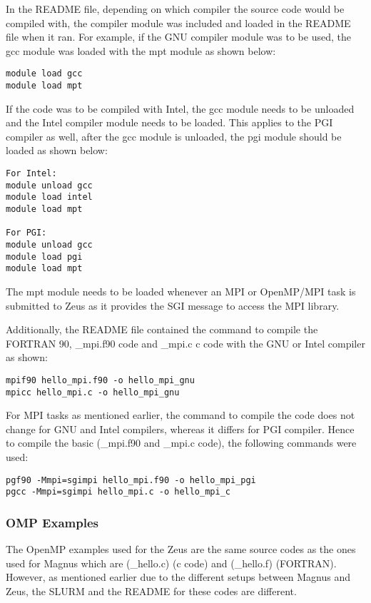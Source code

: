 \documentclass[journal]{IEEEtran}
\begin{document}
{In the README file, depending on which compiler the source code would be compiled with, the compiler module was included and loaded in the README file 
when it ran. For example, if the GNU compiler module was to be used, the gcc module was loaded with the mpt module as shown below:

\begin{verbatim}
module load gcc
module load mpt
\end{verbatim}

If the code was to be compiled with Intel, the gcc module needs to be unloaded and the Intel compiler module needs to be loaded. This applies to the PGI
compiler as well, after the gcc module is unloaded, the pgi module should be loaded as shown below:

\begin{verbatim}
For Intel:
module unload gcc
module load intel
module load mpt

For PGI:
module unload gcc
module load pgi
module load mpt
\end{verbatim}

The mpt module needs to be loaded whenever an MPI or OpenMP/MPI task is submitted to Zeus as it provides the SGI message to access the MPI library.

Additionally, the README file contained the command to compile the FORTRAN 90, \hello\_mpi.f90 code and \hello\_mpi.c c code with the GNU or Intel compiler 
as shown:

\begin{verbatim}
mpif90 hello_mpi.f90 -o hello_mpi_gnu
mpicc hello_mpi.c -o hello_mpi_gnu
\end{verbatim}

For MPI tasks as mentioned earlier, the command to compile the code does not change for GNU and Intel compilers, whereas it differs for PGI compiler.
Hence to compile the basic (\hello\_mpi.f90 and \hello\_mpi.c code), the following commands were used:

\begin{verbatim}
pgf90 -Mmpi=sgimpi hello_mpi.f90 -o hello_mpi_pgi
pgcc -Mmpi=sgimpi hello_mpi.c -o hello_mpi_c 
\end{verbatim}  

\subsubsection{OMP Examples}

The OpenMP examples used for the Zeus are the same source codes as the ones used for Magnus which are (\omp\_hello.c) (c code) and (\omp\_hello.f) (FORTRAN).
However, as mentioned earlier due to the different setups between Magnus and Zeus, the SLURM and the README for these codes are different.

}
\end{document}
